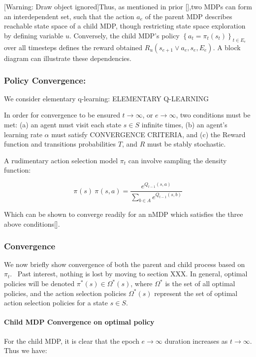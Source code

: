 \documentclass{article}
\begin{document}
[Warning: Draw object ignored]Thus, as mentioned in prior [],two MDPs can form an interdependent set, such that the action  $a_e$ of the parent MDP describes reachable state space of a child MDP, though restricting state space exploration by defining variable  $u$. Conversely, the child MDP's policy  $\left\{a_t=\pi _t(s_t)\right\}_{t{\in}E_e}^{}$ over all timesteps defines the reward obtained  $R_u\left(s_{e+1}\vee a_e,s_e,E_e\right)$. A block diagram can illustrate these dependencies.

\subsubsection{Policy Convergence:}
We consider elementary q-learning: ELEMENTARY Q-LEARNING

In order for convergence to be ensured  $t\rightarrow {\infty}$, or  $e\rightarrow {\infty}$, two conditions must be met: (a) an agent must visit each state  $s{\in}S$ infinite times, (b) an agent's learning rate  $\alpha $ must satisfy CONVERGENCE CRITERIA, and (c) the Reward function and transitions probabilities  $T$, and  $R$ must be stably stochastic.

A rudimentary action selection model  $\pi _t$ can involve sampling the density function:

\begin{equation}
\pi _{}\left(s\right)\ \pi _{}\left(s,a\right)=\frac{e^{Q_{t-1}(s,a)}}{\sum _{b{\in}A}^{}e^{Q_{t-1}(s,b)}}
\end{equation}

\bigskip

Which can be shown to converge readily for an nMDP which satisfies the three above conditions[].

\subsubsection{Convergence}
We now briefly show convergence of both the parent and child process based on  $\pi _t$. \ Past interest, nothing is lost by moving to section XXX. In general, optimal policies will be denoted  $\pi ^{\ast }(s){\in}\Omega ^{\ast }(s)$, where  $\Omega ^{\ast }$ is the set of all optimal policies, and the action selection policies  $\Omega ^{\ast }(s)$ represent the set of optimal action selection policies for a state  $s{\in}S$. 

\paragraph{Child MDP Convergence on optimal policy}
For the child MDP, it is clear that the epoch  $e\rightarrow {\infty}$ duration increases as  $t\rightarrow {\infty}$. Thus we have:
\end{document}
